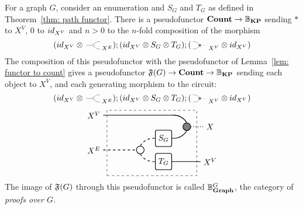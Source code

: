 \begin{theorem}
  For a graph $G$, consider an enumeration and $S_G$ and $T_G$ 
  as defined in Theorem~\ref{thm: path functor}. There is a pseudofunctor 
  $\textbf{Count} \to \mathbb{B}_\textbf{KP}$ sending $*$ to $X^V$, $0$ to $id_{X^V}$ 
  and $n > 0$ to the $n$-fold composition of the morphism
  \begin{equation*}
      (\Id{X^V} \Tensor \COPYSym_{X^E});
      (\Id{X^V} \Tensor S_G \Tensor T_G);(\MATCHSym_{X^V} \Tensor \Id{X^V})
  \end{equation*}
  The composition of this pseudofunctor with the pseudofunctor of 
  Lemma~\ref{lem: functor to count} gives a pseudofunctor 
  $\mathfrak{F}(G) \to \textbf{Count} \to \mathbb{B}_\textbf{KP}$ sending each object to $X^V$, and each 
  generating morphism to the circuit:
  \begin{equation*}
    (\Id{X^V} \Tensor \COPYSym_{X^E});
      (\Id{X^V} \Tensor S_G \Tensor T_G);(\MATCHSym_{X^V} \Tensor \Id{X^V})
  \end{equation*}
  \begin{equation*}
    \begin{tikzpicture}
      \node[draw, circle, radius=5pt, thick] (copy) at (-1,0.5) {};
      \node[draw, minimum height=20, minimum width=20, rounded corners=2, thick] (S) at (0,1) {$S_G$};
      \node[draw, minimum height=20, minimum width=20, rounded corners=2, thick] (T) at (0,0) {$T_G$};
      \node[draw, fill=gray, circle, radius=5pt, thick] (mat) at (1,1.5) {};

      \node[draw, dashed, minimum height=80, minimum width=110] (contour) at (-0.5,0.8) {};

      \node (Xv) at (-3,2) {$X^V$};
      \node (Xe) at (-3,0.5) {$X^E$};
      \node (X) at (2,1.5) {$X$};
      \node (Xv2) at (2,0) {$X^V$};

      \draw[-, thick] (Xv) to (10pt,2);
      \draw[bend left, thick] (10pt,2) to (mat.north);
      \draw[bend right, thick] (S.east) to (mat.south);

      \draw[dashed, -, thick] (Xe) to (copy.west);

      \draw[dashed, bend left, thick] (copy.north) to (S.west);
      \draw[dashed, bend right, thick] (copy.south) to (T.west);

      \draw[-, dotted, thick] (mat.east) -- (X);
      \draw[-, thick] (T.east) -- (Xv2.west);
    \end{tikzpicture}
  \end{equation*}
  The image of $\mathfrak{F}(G)$ through this pseudofunctor 
  is called $\mathbb{B}^{G}_{\textbf{Graph}}$, the category of \emph{proofs over $G$.}
\end{theorem}
